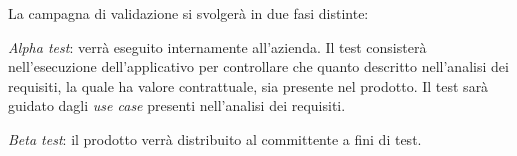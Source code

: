  



La campagna di validazione si svolger\`a in due fasi distinte:
\begin{elenconumerato}[\textbf{}]{\subsubsecindent}
\item \textit{Alpha test}: verr\`a eseguito internamente all'azienda. Il test consister\`a nell'esecuzione dell'applicativo per controllare che quanto descritto nell'analisi dei requisiti, la quale ha valore contrattuale, sia presente nel prodotto. Il test sar\`a guidato dagli \textit{use case} presenti nell'analisi dei requisiti.
\item \textit{Beta test}: il prodotto verr\`a distribuito al committente a fini di test.
\end{elenconumerato}


